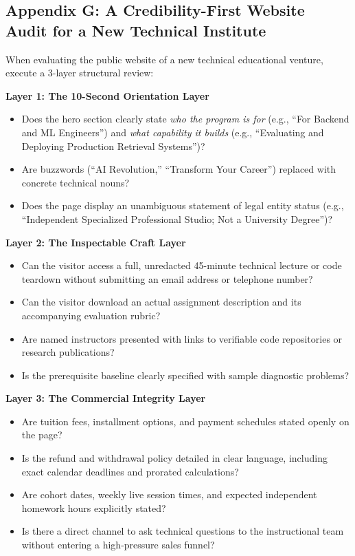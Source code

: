 \subsection*{Appendix G: A Credibility-First Website Audit for a New Technical Institute}

When evaluating the public website of a new technical educational venture, execute a 3-layer structural review:

\noindent\textbf{Layer 1: The 10-Second Orientation Layer}
\begin{itemize}
\item Does the hero section clearly state \emph{who the program is for} (e.g., ``For Backend and ML Engineers'') and \emph{what capability it builds} (e.g., ``Evaluating and Deploying Production Retrieval Systems'')?
\item Are buzzwords (``AI Revolution,'' ``Transform Your Career'') replaced with concrete technical nouns?
\item Does the page display an unambiguous statement of legal entity status (e.g., ``Independent Specialized Professional Studio; Not a University Degree'')?
\end{itemize}

\noindent\textbf{Layer 2: The Inspectable Craft Layer}
\begin{itemize}
\item Can the visitor access a full, unredacted 45-minute technical lecture or code teardown without submitting an email address or telephone number?
\item Can the visitor download an actual assignment description and its accompanying evaluation rubric?
\item Are named instructors presented with links to verifiable code repositories or research publications?
\item Is the prerequisite baseline clearly specified with sample diagnostic problems?
\end{itemize}

\noindent\textbf{Layer 3: The Commercial Integrity Layer}
\begin{itemize}
\item Are tuition fees, installment options, and payment schedules stated openly on the page?
\item Is the refund and withdrawal policy detailed in clear language, including exact calendar deadlines and prorated calculations?
\item Are cohort dates, weekly live session times, and expected independent homework hours explicitly stated?
\item Is there a direct channel to ask technical questions to the instructional team without entering a high-pressure sales funnel?
\end{itemize}

